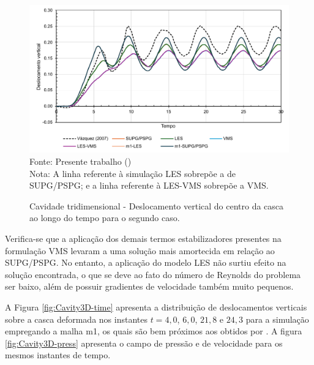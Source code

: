 \begin{figure}[h!]
    \centering
    \caption{Cavidade tridimensional - Deslocamento vertical do centro da casca ao longo do tempo para o segundo caso.}
    \includegraphics[width=\linewidth]{Figuras/FSI-Cavity3D/FSI-cavity3D.pdf}
    \\Fonte: Presente trabalho (\the\year)
    \\\small{Nota: A linha referente à simulação LES sobrepõe a de SUPG/PSPG; e a linha referente à LES-VMS sobrepõe a VMS.}
    \label{fig:Cavity3D-rescoarse}
\end{figure}

Verifica-se que a aplicação dos demais termos estabilizadores presentes na formulação VMS levaram a uma solução mais amortecida em relação ao SUPG/PSPG. No entanto, a aplicação do modelo LES não surtiu efeito na solução encontrada, o que se deve ao fato do número de Reynolds do problema ser baixo, além de possuir gradientes de velocidade também muito pequenos.

A Figura \ref{fig:Cavity3D-time} apresenta a distribuição de deslocamentos verticais sobre a casca deformada nos instantes $t=4,0$, $6,0$, $21,8$ e $24,3$ para a simulação empregando a malha m1, os quais são bem próximos aos obtidos por . A figura \ref{fig:Cavity3D-press} apresenta o campo de pressão e de velocidade para os mesmos instantes de tempo.

